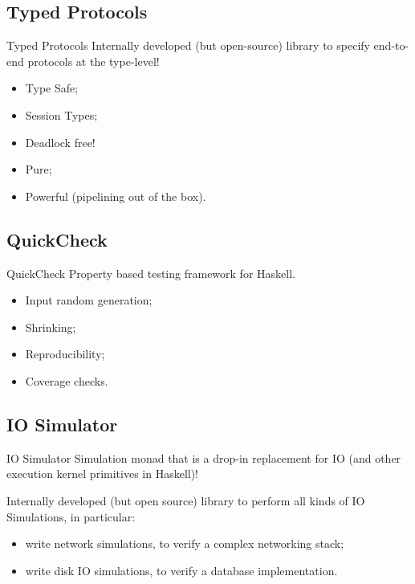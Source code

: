 \documentclass{beamer}
\begin{document}
\subsection*{Typed Protocols}

\begin{frame}{Typed Protocols}
  Internally developed (but open-source) library to specify end-to-end protocols at the type-level!

  \begin{itemize}
    \item Type Safe;
    \item Session Types;
    \item \alert{Deadlock free!}
    \item Pure;
    \item Powerful (pipelining out of the box).
  \end{itemize}

\end{frame}

\subsection*{QuickCheck}

\begin{frame}{QuickCheck}
  Property based testing framework for Haskell.

  \begin{itemize}
    \item \alert{Input random generation};
    \item Shrinking;
    \item \alert{Reproducibility};
    \item Coverage checks.
  \end{itemize}

\end{frame}

\subsection*{IO Simulator}
\begin{frame}{IO Simulator}
  Simulation monad that is a drop-in \alert{replacement} for IO (and other execution
  kernel primitives in Haskell)!

  Internally developed (but open source) library to perform all kinds of \alert{IO
  Simulations}, in particular:

  \begin{itemize}
    \item write \alert{network simulations}, to verify a complex networking stack;
    \item write \alert{disk IO simulations}, to verify a database implementation.
  \end{itemize}
\end{frame}
\end{document}
